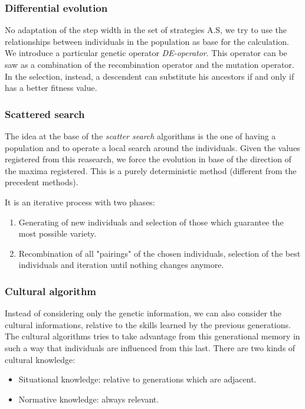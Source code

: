 \documentclass{article}
\begin{document}
\subsubsection{Differential evolution}
No adaptation of the step width in the set of strategies A.S, we try to use the relationships
between individuals in the population as base for the calculation. We introduce a particular
genetic operator \textit{DE-operator}. This operator can be saw as a combination of the
recombination operator and the mutation operator. In the selection, instead, a descendent can
substitute his ancestors if and only if has a better fitness value.

\subsubsection{Scattered search}
The idea at the base of the \textit{scatter search} algorithms is the one of having a population
and to operate a local search around the individuals. Given the values registered from this
reasearch, we force the evolution in base of the direction of the maxima registered.
\newline\newline
This is a purely deterministic method (different from the precedent methods).

It is an iterative process with two phases:
\begin{enumerate}
    \item Generating of new individuals and selection of those which guarantee the most
          possible variety.
    \item Recombination of all "pairings" of the chosen individuals, selection of the best
          individuals and iteration until nothing changes anymore.
\end{enumerate}

\subsubsection{Cultural algorithm}
Instead of considering only the genetic information, we can also consider the cultural informations,
relative to the skills learned by the previous generations. The cultural algorithms tries to take
advantage from this generational memory in such a way that individuals are influenced from this
last.
There are two kinds of cultural knowledge:
\begin{itemize}
    \item Situational knowledge: relative to generations which are adjacent.
    \item Normative knowledge: always relevant.
\end{itemize}
\end{document}
